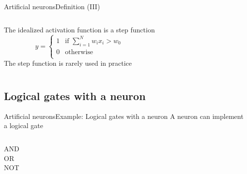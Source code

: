 \documentclass[10pt,compress]{beamer} %
\begin{document}
\begin{frame}{Artificial neurons}{Definition (III)}
	\begin{columns}
	The idealized activation function is a step function
	\begin{equation*}
	y =
	  \begin{cases}
	      1  & \text{if } \sum_{i=1}^{N} w_i x_i > w_0\\
		  0  & \text{otherwise}\\
	  \end{cases}
	\end{equation*}
	The step function is rarely used in practice

 	\end{columns}

\end{frame}

\subsection{Logical gates with a neuron}
\begin{frame}{Artificial neurons}{Example: Logical gates with a neuron}
	A neuron can implement a logical gate

    \begin{columns}
 	   \column{.30\textwidth}
	   		\centering AND\\
            
 	   \column{.30\textwidth}
	   		\centering OR\\
            
 	   \column{.30\textwidth}
	   		\centering NOT\\
            
    \end{columns}
\end{frame}
\end{document}
